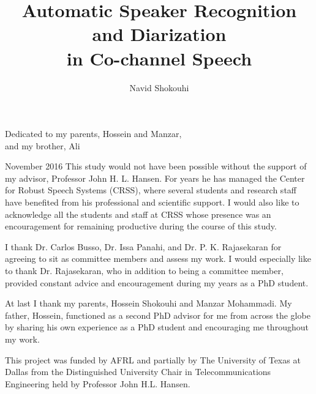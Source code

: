 \documentclass[doublespacing]{utdthesis}
\author{Navid Shokouhi}
\title{Automatic Speaker Recognition and Diarization \\
		in Co-channel Speech}
\begin{document}
\frontmatter

\signaturepage

\begin{dedication} %
Dedicated to my parents, Hossein and Manzar, \\ 
and my brother, Ali \\
\end{dedication}

\maketitle

\begin{acks}{November 2016} %
This study would not have been possible without the support of my advisor, Professor John H. L. Hansen. 
For years he has managed the Center for Robust Speech Systems (CRSS), where several students and research staff have benefited from his professional and scientific support. 
I would also like to acknowledge all the students and staff at CRSS whose presence was an encouragement for remaining productive during the course of this study. 

I thank Dr. Carlos Busso, Dr. Issa Panahi, and Dr. P. K. Rajasekaran for agreeing to sit as committee members and assess my work. 
I would especially like to thank Dr. Rajasekaran, who in addition to being a committee member, provided constant advice and encouragement during my years as a PhD student. 

At last I thank my parents, Hossein Shokouhi and Manzar Mohammadi. 
My father, Hossein, functioned as a second PhD advisor for me from across the globe by sharing his own experience as a PhD student and encouraging me throughout my work. 

This project was funded by AFRL and partially by The University of Texas at Dallas from the Distinguished University Chair in Telecommunications Engineering held by Professor John H.L. Hansen.

\end{acks}

\end{document}
